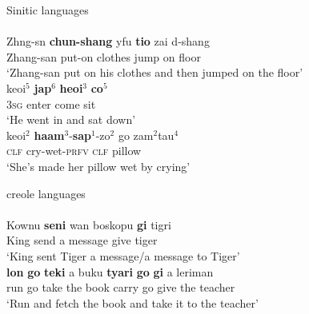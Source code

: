 \ea
Sinitic languages\\
\ea \label{Man01}
\\
\gll Zhng-sn \textbf{chun-shang} yfu \textbf{tio} zai d-shang\\
Zhang-san put-on clothes jump on floor\\
\glt ‘Zhang-san put on his clothes and then jumped on the floor’
\ex \label{Can01}
\\
\gll keoi$^5$ \textbf{jap$^6$} \textbf{heoi$^3$} \textbf{co$^5$}\\
\textsc{3}\textsc{sg} enter come sit\\
\glt ‘He went in and sat down’
\ex \label{Can02}
\\
\gll keoi$^2$ \textbf{haam$^3$}-\textbf{sap$^1$}-zo$^2$ go zam$^2$tau$^4$\\
\textsc{clf} cry-wet-\textsc{prfv} \textsc{clf} pillow\\
\glt ‘She's made her pillow wet by crying’
\z
\z

\ea
creole languages\\
\ea \label{Sra01}
\\
\gll Kownu \textbf{seni} wan boskopu \textbf{gi} tigri\\
King send a message give tiger\\
\glt ‘King sent Tiger a message/a message to Tiger’
\ex \label{Sra02}
\\
\gll \textbf{lon} \textbf{go} \textbf{teki} a buku \textbf{tyari} \textbf{go} \textbf{gi} a leriman\\
run go take the book carry go give the teacher\\
\glt ‘Run and fetch the book and take it to the teacher’
\z
\z

